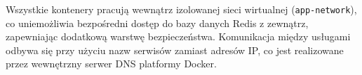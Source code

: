 Wszystkie kontenery pracują wewnątrz izolowanej sieci wirtualnej (\texttt{app-network}), co uniemożliwia bezpośredni dostęp do bazy danych Redis z zewnątrz, zapewniając dodatkową warstwę bezpieczeństwa. Komunikacja między usługami odbywa się przy użyciu nazw serwisów zamiast adresów IP, co jest realizowane przez wewnętrzny serwer DNS platformy Docker.

